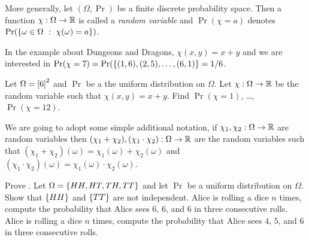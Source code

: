 More generally, let $(\Omega, \Pr)$ be a finite discrete probability space. Then
a function $\chi : \Omega \to {\mathbb{R}}$ is called a \emph{random variable} and 
$\Pr(\chi = a)$ denotes $\Pr(\set[\chi(\omega) = a]{\omega \in \Omega})$. 

In the example about Dungeons and Dragons, $\chi(x, y) = x + y$ and 
we are interested in $\Pr(\chi = 7) = \Pr(\set{(1, 6), (2, 5), \dots, (6, 1)} =
1/ 6$.
\begin{exercise}
  Let $\Omega = {[{6}]}^2$ and $\Pr$ be a the uniform distribution on
  $\Omega$. Let $\chi : \Omega \to {\mathbb{R}}$ be the random variable such that 
  $\chi(x, y) = x + y$. Find $\Pr(\chi = 1)$, \dots, $\Pr(\chi = 12)$.
\end{exercise}

We are going to adopt some simple additional notation, if 
$\chi_1, \chi_2 : \Omega \to {\mathbb{R}}$ are random variables then 
$(\chi_1 + \chi_2), (\chi_1 \cdot \chi_2) : \Omega \to {\mathbb{R}}$ are the random
variables such that $(\chi_1 + \chi_2)(\omega) = \chi_1(\omega) +
\chi_2(\omega)$ and $(\chi_1 \cdot \chi_2)(\omega) = \chi_1(\omega) \cdot
\chi_2(\omega)$.

\begin{chapterendexercises}
  \exercise Prove .
  \exercise Let $\Omega = \set{HH, HT, TH, TT}$ and let $\Pr$ be a uniform
    distribution on $\Omega$. Show that $\set{HH}$ and $\set{TT}$ are not
    independent.
  \exercise Alice is rolling a dice $n$ times, compute the probability
    that Alice sees $6$, $6$, and $6$ in three consecutive rolls.
  \exercise Alice is rolling a dice $n$ times, compute the probability
    that Alice sees $4$, $5$, and $6$ in three consecutive rolls.
\end{chapterendexercises}
